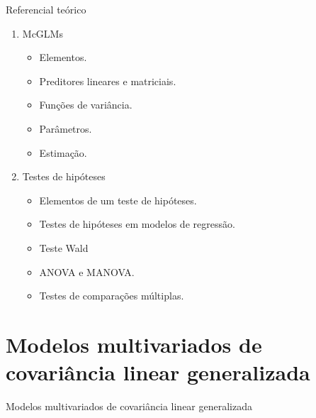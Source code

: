 \documentclass[
  ignorenonframetext,
  serif,
  professionalfont,
  usenames,
  dvipsnames,
  aspectratio = 169]{beamer}
\begin{document}
\begin{frame}{Referencial teórico}
\begin{enumerate}
    \itemsep 2ex
    
  \item McGLMs
    \begin{itemize}
      \item Elementos.
      \item Preditores lineares e matriciais.
      \item Funções de variância.
      \item Parâmetros.
      \item Estimação.
    \end{itemize}
    
  \item Testes de hipóteses
    \begin{itemize}
      \item Elementos de um teste de hipóteses.
      \item Testes de hipóteses em modelos de regressão.
      \item Teste Wald
      \item ANOVA e MANOVA.
      \item Testes de comparações múltiplas.
    \end{itemize}
\end{enumerate}
\end{frame}

\hypertarget{modelos-multivariados-de-covariuxe2ncia-linear-generalizada-3}{%
\section{Modelos multivariados de covariância linear
generalizada}\label{modelos-multivariados-de-covariuxe2ncia-linear-generalizada-3}}

\begin{frame}{Modelos multivariados de covariância linear generalizada}
\end{frame}
\end{document}
